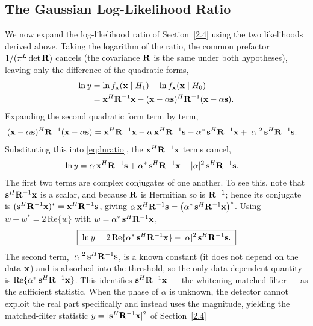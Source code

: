 \documentclass{article}
\begin{document}
\subsection{The Gaussian Log-Likelihood Ratio}
\label{app:gllr}
We now expand the log-likelihood ratio of Section~\ref{2.4} using the two likelihoods derived above. Taking the logarithm of the ratio, the common prefactor $1/(\pi^L\det\mathbf{R})$ cancels (the covariance $\mathbf{R}$ is the same under both hypotheses), leaving only the difference of the quadratic forms,
\begin{align}
  \ln y
    &= \ln f_{\vb x}(\vb x\mid H_1) - \ln f_{\vb x}(\vb x\mid H_0) \nonumber\\
    &= \vb x^H\mathbf{R}^{-1}\vb x
       - (\vb x-\alpha\vb s)^H\mathbf{R}^{-1}(\vb x-\alpha\vb s). \label{eq:lnratio}
\end{align}
Expanding the second quadratic form term by term,
\begin{align}
  (\vb x-\alpha\vb s)^H\mathbf{R}^{-1}(\vb x-\alpha\vb s)
    &= \vb x^H\mathbf{R}^{-1}\vb x
     - \alpha\,\vb x^H\mathbf{R}^{-1}\vb s
     - \alpha^{*}\,\vb s^H\mathbf{R}^{-1}\vb x
     + |\alpha|^2\,\vb s^H\mathbf{R}^{-1}\vb s. \nonumber
\end{align}
Substituting this into \eqref{eq:lnratio}, the $\vb x^H\mathbf{R}^{-1}\vb x$ terms cancel,
\begin{align}
  \ln y
    &= \alpha\,\vb x^H\mathbf{R}^{-1}\vb s
     + \alpha^{*}\,\vb s^H\mathbf{R}^{-1}\vb x
     - |\alpha|^2\,\vb s^H\mathbf{R}^{-1}\vb s. \label{eq:lnexp}
\end{align}
The first two terms are complex conjugates of one another. To see this, note that $\vb s^H\mathbf{R}^{-1}\vb x$ is a scalar, and because $\mathbf{R}$ is Hermitian so is $\mathbf{R}^{-1}$; hence its conjugate is
$(\vb s^H\mathbf{R}^{-1}\vb x)^{*}=\vb x^H\mathbf{R}^{-1}\vb s$, giving $\alpha\,\vb x^H\mathbf{R}^{-1}\vb s=\big(\alpha^{*}\,\vb s^H\mathbf{R}^{-1}\vb x\big)^{*}$.
Using $w+w^{*}=2\,\mathrm{Re}\{w\}$ with $w=\alpha^{*}\,\vb s^H\mathbf{R}^{-1}\vb x$,
\begin{equation}
  \boxed{\;\ln y = 2\,\mathrm{Re}\{\alpha^{*}\,\vb s^H\mathbf{R}^{-1}\vb x\}
                 - |\alpha|^2\,\vb s^H\mathbf{R}^{-1}\vb s.\;} \label{eq:llrfinal}
\end{equation}
The second term, $|\alpha|^2\,\vb s^H\mathbf{R}^{-1}\vb s$, is a known constant (it does not depend on the data $\vb x$) and is absorbed into the threshold, so the only data-dependent quantity is $\mathrm{Re}\{\alpha^{*}\,\vb s^H\mathbf{R}^{-1}\vb x\}$. This identifies $\vb s^H\mathbf{R}^{-1}\vb x$ --- the whitening matched filter --- as the sufficient statistic. When the phase of $\alpha$ is unknown, the detector cannot exploit the real part specifically and instead uses the magnitude, yielding the
matched-filter statistic $y=|\vb s^H\mathbf{R}^{-1}\vb x|^2$ of Section~\ref{2.4}
\end{document}
